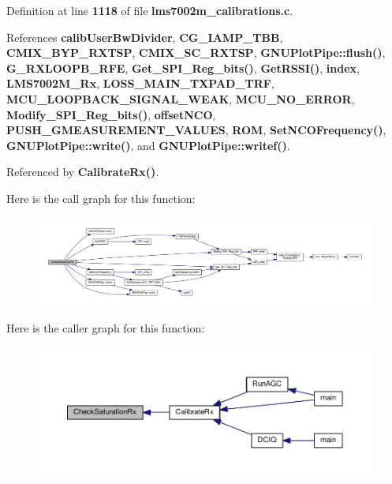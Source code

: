 Definition at line {\bf 1118} of file {\bf lms7002m\+\_\+calibrations.\+c}.



References {\bf calib\+User\+Bw\+Divider}, {\bf C\+G\+\_\+\+I\+A\+M\+P\+\_\+\+T\+BB}, {\bf C\+M\+I\+X\+\_\+\+B\+Y\+P\+\_\+\+R\+X\+T\+SP}, {\bf C\+M\+I\+X\+\_\+\+S\+C\+\_\+\+R\+X\+T\+SP}, {\bf G\+N\+U\+Plot\+Pipe\+::flush()}, {\bf G\+\_\+\+R\+X\+L\+O\+O\+P\+B\+\_\+\+R\+FE}, {\bf Get\+\_\+\+S\+P\+I\+\_\+\+Reg\+\_\+bits()}, {\bf Get\+R\+S\+S\+I()}, {\bf index}, {\bf L\+M\+S7002\+M\+\_\+\+Rx}, {\bf L\+O\+S\+S\+\_\+\+M\+A\+I\+N\+\_\+\+T\+X\+P\+A\+D\+\_\+\+T\+RF}, {\bf M\+C\+U\+\_\+\+L\+O\+O\+P\+B\+A\+C\+K\+\_\+\+S\+I\+G\+N\+A\+L\+\_\+\+W\+E\+AK}, {\bf M\+C\+U\+\_\+\+N\+O\+\_\+\+E\+R\+R\+OR}, {\bf Modify\+\_\+\+S\+P\+I\+\_\+\+Reg\+\_\+bits()}, {\bf offset\+N\+CO}, {\bf P\+U\+S\+H\+\_\+\+G\+M\+E\+A\+S\+U\+R\+E\+M\+E\+N\+T\+\_\+\+V\+A\+L\+U\+ES}, {\bf R\+OM}, {\bf Set\+N\+C\+O\+Frequency()}, {\bf G\+N\+U\+Plot\+Pipe\+::write()}, and {\bf G\+N\+U\+Plot\+Pipe\+::writef()}.



Referenced by {\bf Calibrate\+Rx()}.



Here is the call graph for this function\+:
\nopagebreak
\begin{figure}[H]
\begin{center}
\leavevmode
\includegraphics[width=350pt]{d3/dec/lms7002m__calibrations_8c_a3c09e7c416b748a881c1be540feddf48_cgraph}
\end{center}
\end{figure}




Here is the caller graph for this function\+:
\nopagebreak
\begin{figure}[H]
\begin{center}
\leavevmode
\includegraphics[width=350pt]{d3/dec/lms7002m__calibrations_8c_a3c09e7c416b748a881c1be540feddf48_icgraph}
\end{center}
\end{figure}


